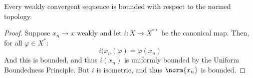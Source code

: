         \begin{theorem}
            Every weakly convergent sequence is bounded with
            respect to the normed topology.
        \end{theorem}
        \begin{proof}
            Suppose $x_{n}\rightarrow{x}$ weakly and let
            $i:X\rightarrow{X}^{**}$ be the canonical map. Then,
            for all $\varphi\in{X}^{*}$:
            \begin{equation}
                i(x_{n}(\varphi)=\varphi(x_{n})
            \end{equation}
            And this is bounded, and thus
            $i(x_{n})$ is uniformly bounded by the Uniform
            Boundedness Principle. But $i$ is isometric, and
            thus $\norm{x_{n}}$ is bounded.
        \end{proof}
